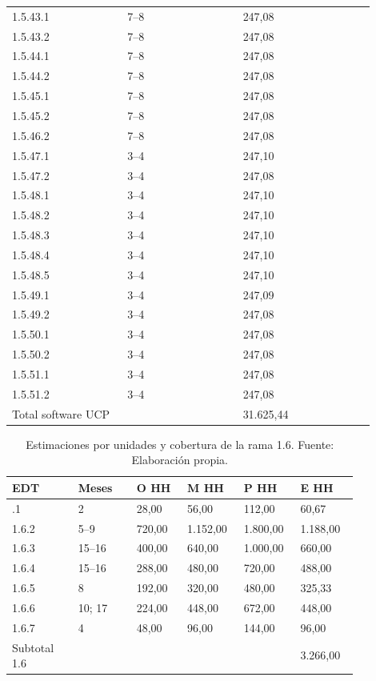 \documentclass[11pt]{article}
\begin{document}
\begin{longtable}{@{}p{0.29\linewidth}p{0.29\linewidth}p{0.32\linewidth}@{}}
1.5.43.1 & 7--8 & 247,08 \\
1.5.43.2 & 7--8 & 247,08 \\
1.5.44.1 & 7--8 & 247,08 \\
1.5.44.2 & 7--8 & 247,08 \\
1.5.45.1 & 7--8 & 247,08 \\
1.5.45.2 & 7--8 & 247,08 \\
1.5.46.2 & 7--8 & 247,08 \\
1.5.47.1 & 3--4 & 247,10 \\
1.5.47.2 & 3--4 & 247,08 \\
1.5.48.1 & 3--4 & 247,10 \\
1.5.48.2 & 3--4 & 247,10 \\
1.5.48.3 & 3--4 & 247,10 \\
1.5.48.4 & 3--4 & 247,10 \\
1.5.48.5 & 3--4 & 247,10 \\
1.5.49.1 & 3--4 & 247,09 \\
1.5.49.2 & 3--4 & 247,08 \\
1.5.50.1 & 3--4 & 247,08 \\
1.5.50.2 & 3--4 & 247,08 \\
1.5.51.1 & 3--4 & 247,08 \\
1.5.51.2 & 3--4 & 247,08 \\
Total software UCP &  & 31.625,44 \\
\end{longtable}
\endgroup



\begingroup
\small
\begin{longtable}{@{}p{0.17\linewidth}p{0.15\linewidth}p{0.13\linewidth}p{0.13\linewidth}p{0.13\linewidth}p{0.15\linewidth}@{}}
\caption[Estimaciones por unidades y cobertura de la rama 1.6]{Estimaciones por unidades y cobertura de la rama 1.6. Fuente: Elaboración propia.}\label{tab:t15-tareas-6}\\
\toprule
\textbf{EDT} & \textbf{Meses} & \textbf{O HH} & \textbf{M HH} & \textbf{P HH} & \textbf{E HH} \\
\midrule
\endhead
\bottomrule
\endlastfoot
1.6.1 & 2 & 28,00 & 56,00 & 112,00 & 60,67 \\
1.6.2 & 5--9 & 720,00 & 1.152,00 & 1.800,00 & 1.188,00 \\
1.6.3 & 15--16 & 400,00 & 640,00 & 1.000,00 & 660,00 \\
1.6.4 & 15--16 & 288,00 & 480,00 & 720,00 & 488,00 \\
1.6.5 & 8 & 192,00 & 320,00 & 480,00 & 325,33 \\
1.6.6 & 10; 17 & 224,00 & 448,00 & 672,00 & 448,00 \\
1.6.7 & 4 & 48,00 & 96,00 & 144,00 & 96,00 \\
Subtotal 1.6 &  &  &  &  & 3.266,00 \\
\end{longtable}
\endgroup
\end{document}
